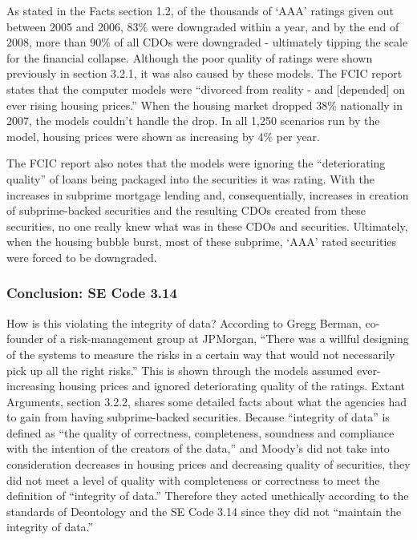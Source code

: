 \documentclass[11pt]{article}
\begin{document}
\begin{multicols}{2}
As stated in the Facts section 1.2, of the thousands of `AAA' ratings given out between 2005 and 2006, 83\% were downgraded within a year, and by the end of 2008, more than 90\% of all CDOs were downgraded\cite[p.224]{govtReport} - ultimately tipping the scale for the financial collapse. \cite[p.~xxv]{govtReport}  Although the poor quality of ratings were shown previously in section 3.2.1, it was also caused by these models.  The FCIC report states that the computer models were ``divorced from reality - and [depended] on ever rising housing prices.'' When the housing market dropped 38\% nationally in 2007, the models couldn't handle the drop.  In all 1,250 scenarios run by the model, housing prices were shown as increasing by 4\% per year. \cite[p.120-121]{govtReport}

The FCIC report also notes that the models were ignoring the ``deteriorating quality'' of loans being packaged into the securities it was rating.  With the increases in subprime mortgage lending and, consequentially, increases in creation of subprime-backed securities and the resulting CDOs created from these securities, no one really knew what was in these CDOs and securities.  Ultimately, when the housing bubble burst, most of these subprime, `AAA' rated securities were forced to be downgraded. \cite[p.121]{govtReport}

\subsubsection{Conclusion: SE Code 3.14}

How is this violating the integrity of data?  According to Gregg Berman, co-founder of a risk-management group at JPMorgan, ``There was a willful designing of the systems to measure the risks in a certain way that would not necessarily pick up all the right risks.'' \cite{nyTimesQuants}  This is shown through the models assumed ever-increasing housing prices and ignored deteriorating quality of the ratings.  Extant Arguments, section 3.2.2, shares some detailed facts about what the agencies had to gain from having subprime-backed securities.  Because ``integrity of data'' \cite{SEcode} is defined as ``the quality of correctness, completeness, soundness and compliance with the intention of the creators of the data,'' \cite{dataIntegrityDef} and Moody's did not take into consideration decreases in housing prices and decreasing quality of securities, they did not meet a level of quality with completeness or correctness to meet the definition of ``integrity of data.'' Therefore they acted unethically according to the standards of Deontology and the SE Code 3.14 since they did not ``maintain the integrity of data.'' \cite{SEcode}



\end{multicols}
\end{document}
